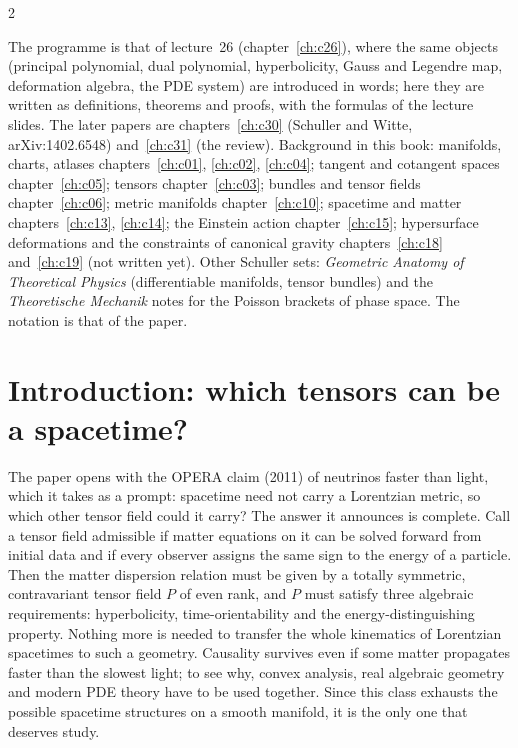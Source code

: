 \begin{paracol}{2}
\begin{reading}
The programme is that of lecture~26 (chapter~\ref{ch:c26}), where the same objects (principal polynomial, dual polynomial, hyperbolicity, Gauss and Legendre map, deformation algebra, the PDE system) are introduced in words; here they are written as definitions, theorems and proofs, with the formulas of the lecture slides. The later papers are chapters~\ref{ch:c30} (Schuller and Witte, arXiv:1402.6548) and~\ref{ch:c31} (the review). Background in this book: manifolds, charts, atlases chapters~\ref{ch:c01}, \ref{ch:c02}, \ref{ch:c04}; tangent and cotangent spaces chapter~\ref{ch:c05}; tensors chapter~\ref{ch:c03}; bundles and tensor fields chapter~\ref{ch:c06}; metric manifolds chapter~\ref{ch:c10}; spacetime and matter chapters~\ref{ch:c13}, \ref{ch:c14}; the Einstein action chapter~\ref{ch:c15}; hypersurface deformations and the constraints of canonical gravity chapters~\ref{ch:c18} and~\ref{ch:c19} (not written yet). Other Schuller sets: \emph{Geometric Anatomy of Theoretical Physics} (differentiable manifolds, tensor bundles) and the \emph{Theoretische Mechanik} notes for the Poisson brackets of phase space. The notation is that of the paper.
\end{reading}

\section{Introduction: which tensors can be a spacetime?}\label{sec:c29-intro}

The paper opens with the OPERA claim (2011) of neutrinos faster than light, which it takes as a prompt: spacetime need not carry a Lorentzian metric, so which other tensor field could it carry?  The answer it announces is complete. Call a tensor field admissible if matter equations on it can be solved forward from initial data and if every observer assigns the same sign to the energy of a particle. Then the matter dispersion relation must be given by a totally symmetric, contravariant tensor field $P$ of even rank, and $P$ must satisfy three algebraic requirements: hyperbolicity, time-orientability and the energy-distinguishing property. Nothing more is needed to transfer the whole kinematics of Lorentzian spacetimes to such a geometry. Causality survives even if some matter propagates faster than the slowest light; to see why, convex analysis, real algebraic geometry and modern PDE theory have to be used together. Since this class exhausts the possible spacetime structures on a smooth manifold, it is the only one that deserves study.


\end{paracol}
